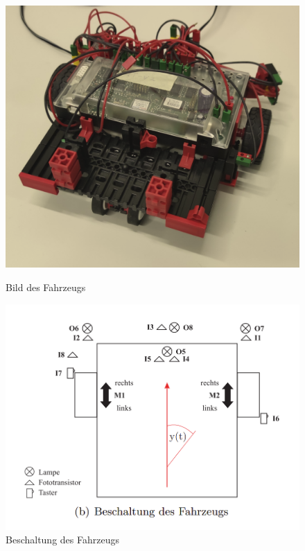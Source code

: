 \documentclass[a4paper, 12pt]{article}
\begin{document}
\begin{figure}[H]
\begin{minipage}{.5\textwidth}
    \centering
    \includegraphics[width=.9\linewidth]{fig_fahrzeug.png}
    \caption{Bild des Fahrzeugs}
    \label{fig:test1}
  \end{minipage}%
  \begin{minipage}{.5\textwidth}
    \centering
    \includegraphics[width=1\linewidth]{bild11.png}
    \caption{Beschaltung des Fahrzeugs}
    \label{fig:test2}
  \end{minipage}
\end{figure}
\end{document}
